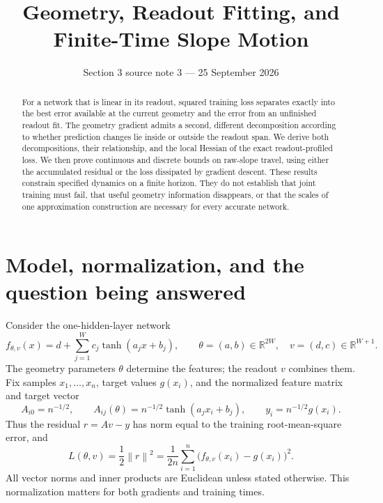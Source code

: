 \documentclass[11pt]{article}
\title{Geometry, Readout Fitting, and Finite-Time Slope Motion}
\author{}
\date{Section 3 source note 3 --- 25 September 2026}
\theoremstyle{remark}
\newcommand{\R}{\mathbb{R}}
\newcommand{\norm}[1]{\left\lVert #1\right\rVert}
\begin{document}
\maketitle

\begin{abstract}
For a network that is linear in its readout, squared training loss separates exactly into the best error available at the current geometry and the error from an unfinished readout fit. The geometry gradient admits a second, different decomposition according to whether prediction changes lie inside or outside the readout span. We derive both decompositions, their relationship, and the local Hessian of the exact readout-profiled loss. We then prove continuous and discrete bounds on raw-slope travel, using either the accumulated residual or the loss dissipated by gradient descent. These results constrain specified dynamics on a finite horizon. They do not establish that joint training must fail, that useful geometry information disappears, or that the scales of one approximation construction are necessary for every accurate network.
\end{abstract}

\section{Model, normalization, and the question being answered}

Consider the one-hidden-layer network
\begin{equation}
 f_{\theta,v}(x)=d+\sum_{j=1}^{W}c_j\tanh(a_jx+b_j),
 \qquad \theta=(a,b)\in\R^{2W},\quad v=(d,c)\in\R^{W+1}.
 \label{eq:model}
\end{equation}
The geometry parameters $\theta$ determine the features; the readout $v$ combines them. Fix samples $x_1,\ldots,x_n$, target values $g(x_i)$, and the normalized feature matrix and target vector
\begin{equation}
 A_{i0}=n^{-1/2},\qquad
 A_{ij}(\theta)=n^{-1/2}\tanh(a_jx_i+b_j),\qquad
 y_i=n^{-1/2}g(x_i).
\end{equation}
Thus the residual $r=Av-y$ has norm equal to the training root-mean-square error, and
\begin{equation}
 L(\theta,v)=\frac12\norm{r}^2
 =\frac{1}{2n}\sum_{i=1}^{n}\bigl(f_{\theta,v}(x_i)-g(x_i)\bigr)^2.
 \label{eq:loss}
\end{equation}
All vector norms and inner products are Euclidean unless stated otherwise. This normalization matters for both gradients and training times.
\end{document}

